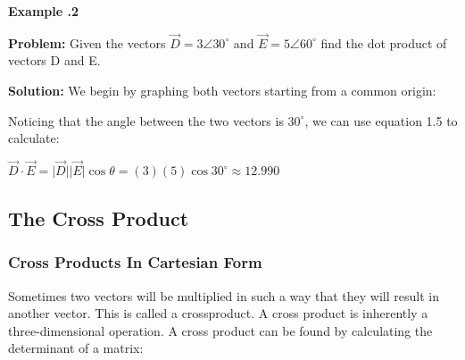 	
		\begin{mdframed}[backgroundcolor=blue!10!white]
		\begin{center}
			\textbf{Example \thesubsection.2}	\label{example:dotproduct2}
			\vspace{0.1in}
			
			
		\end{center}
		
		\textbf{Problem:} Given the vectors $ \vec{D} = 3 \angle 30^{\circ} $ and $\vec{E} = 5 \angle 60^{\circ}$ find the dot product of vectors D and E. 
		
		\vspace{.1in}
		
		\textbf{Solution:}  We begin by graphing both vectors starting from a common origin:
		\begin{center}
			

		\end{center}
			
			Noticing that the angle between the two vectors is $30^\circ$, we can use equation 1.5 to calculate:
			
			\begin{center}
				$ 		\vec{D} \cdot \vec{E} = \lvert \vec{D} \rvert  \lvert \vec{E} \rvert \cos{\theta} = (3)(5)\cos30^\circ \approx \boxed{12.990} $
			\end{center}
		
		
		
		
		\begin{center}
			
		\end{center}
		
		
	\end{mdframed}
	
	
	
	\subsection{The Cross Product}   
	\subsubsection{Cross Products In Cartesian Form}
	Sometimes two vectors will be multiplied in such a way that they will result in another vector.  This is called a \gls{crossproduct}.  A cross product is inherently a three-dimensional operation.  A cross product can be found by calculating the \gls{determinant} of a matrix:  
	

